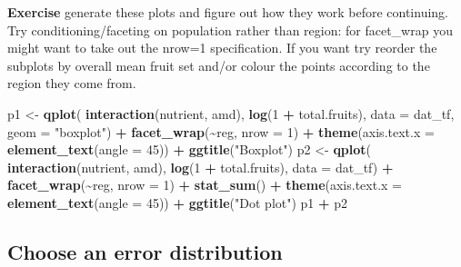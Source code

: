 \documentclass[
  12pt,
]{book}
\makeatletter
\newenvironment{Shaded}{\begin{snugshade}}{\end{snugshade}}
\newcommand{\DataTypeTok}[1]{\textcolor[rgb]{0.13,0.29,0.53}{#1}}
\newcommand{\DecValTok}[1]{\textcolor[rgb]{0.00,0.00,0.81}{#1}}
\newcommand{\KeywordTok}[1]{\textcolor[rgb]{0.13,0.29,0.53}{\textbf{#1}}}
\newcommand{\NormalTok}[1]{#1}
\newcommand{\OperatorTok}[1]{\textcolor[rgb]{0.81,0.36,0.00}{\textbf{#1}}}
\newcommand{\StringTok}[1]{\textcolor[rgb]{0.31,0.60,0.02}{#1}}
\newenvironment{kframe}{%
\medskip{}
\setlength{\fboxsep}{.8em}
\def\at@end@of@kframe{}%
\ifinner\ifhmode%
 \def\at@end@of@kframe{\end{minipage}}%
 \begin{minipage}{\columnwidth}%
\fi\fi%
\def\FrameCommand##1{\hskip\@totalleftmargin \hskip-\fboxsep
\colorbox{incolor}{##1}\hskip-\fboxsep
    \hskip-\linewidth \hskip-\@totalleftmargin \hskip\columnwidth}%
\MakeFramed {\advance\hsize-\width
  \@totalleftmargin\z@ \linewidth\hsize
  \@setminipage}}%
{\par\unskip\endMakeFramed%
\at@end@of@kframe}
\newenvironment{rmdblock}[1]
 {
 \begin{itemize}
 \renewcommand{\labelitemi}{
   \raisebox{-.7\height}[0pt][0pt]{
     {\setkeys{Gin}{width=3em,keepaspectratio}\texttt{[image: images/icons/\#1]}}
   }
 }
 \begin{kframe}
 \setlength{\fboxsep}{1em}
 \item
 }
 {
 \end{kframe}
 \end{itemize}
 }
\newenvironment{rmdcode}
  {\begin{rmdblock}{code}}
  {\end{rmdblock}}
\makeatother
\begin{document}
\begin{rmdcode}
\textbf{Exercise} generate these plots and figure out how they work before continuing. Try conditioning/faceting on population rather than region: for facet\_wrap you might want to take out the nrow=1 specification. If you want try reorder the subplots by overall mean fruit set and/or colour the points according to the region they come from.
\end{rmdcode}

\begin{Shaded}
\begin{Highlighting}[]
\NormalTok{p1 \textless{}{-}}\StringTok{ }\KeywordTok{qplot}\NormalTok{(}
    \KeywordTok{interaction}\NormalTok{(nutrient, amd),}
    \KeywordTok{log}\NormalTok{(}\DecValTok{1} \OperatorTok{+}\StringTok{ }\NormalTok{total.fruits),}
    \DataTypeTok{data =}\NormalTok{ dat\_tf, }\DataTypeTok{geom =} \StringTok{"boxplot"}\NormalTok{) }\OperatorTok{+}
\StringTok{  }\KeywordTok{facet\_wrap}\NormalTok{(}\OperatorTok{\textasciitilde{}}\NormalTok{reg, }\DataTypeTok{nrow =} \DecValTok{1}\NormalTok{) }\OperatorTok{+}
\StringTok{  }\KeywordTok{theme}\NormalTok{(}\DataTypeTok{axis.text.x =} \KeywordTok{element\_text}\NormalTok{(}\DataTypeTok{angle =} \DecValTok{45}\NormalTok{)) }\OperatorTok{+}
\StringTok{  }\KeywordTok{ggtitle}\NormalTok{(}\StringTok{"Boxplot"}\NormalTok{)}
\NormalTok{p2 \textless{}{-}}\StringTok{ }\KeywordTok{qplot}\NormalTok{(}
    \KeywordTok{interaction}\NormalTok{(nutrient, amd),}
    \KeywordTok{log}\NormalTok{(}\DecValTok{1} \OperatorTok{+}\StringTok{ }\NormalTok{total.fruits),}
    \DataTypeTok{data =}\NormalTok{ dat\_tf) }\OperatorTok{+}
\StringTok{  }\KeywordTok{facet\_wrap}\NormalTok{(}\OperatorTok{\textasciitilde{}}\NormalTok{reg, }\DataTypeTok{nrow =} \DecValTok{1}\NormalTok{) }\OperatorTok{+}
\StringTok{  }\KeywordTok{stat\_sum}\NormalTok{() }\OperatorTok{+}
\StringTok{  }\KeywordTok{theme}\NormalTok{(}\DataTypeTok{axis.text.x =} \KeywordTok{element\_text}\NormalTok{(}\DataTypeTok{angle =} \DecValTok{45}\NormalTok{)) }\OperatorTok{+}
\StringTok{  }\KeywordTok{ggtitle}\NormalTok{(}\StringTok{"Dot plot"}\NormalTok{)}
\NormalTok{p1 }\OperatorTok{+}\StringTok{ }\NormalTok{p2}
\end{Highlighting}
\end{Shaded}

\hypertarget{choose-an-error-distribution}{%
\subsection{Choose an error distribution}\label{choose-an-error-distribution}}
\end{document}
